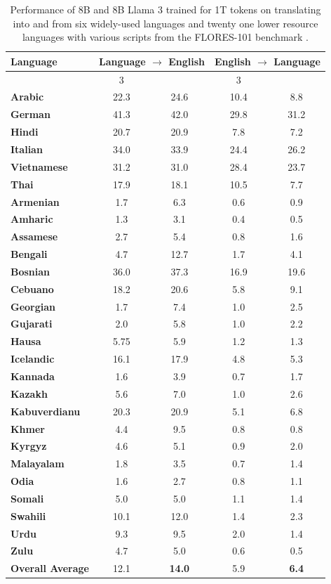 
\begin{table}[t]
\centering
\begin{tabular}{@{}lcccc@{}}
\toprule

 Language & \multicolumn{2}{c}{Language $\rightarrow$ English} & \multicolumn{2}{c}{English $\rightarrow$ Language} \\ 
\midrule
& \llama{} 3 & \model{} & \llama{} 3 & \model{} \\
 \midrule
 \textbf{Arabic} & 22.3 & 24.6 & 10.4  & 8.8 \\
 \textbf{German} & 41.3 & 42.0 & 29.8  & 31.2  \\
 \textbf{Hindi} & 20.7 & 20.9 & 7.8  & 7.2 \\ 
 \textbf{Italian} &  34.0  & 33.9 & 24.4 & 26.2 \\ 
 \textbf{Vietnamese} & 31.2  & 31.0 & 28.4 & 23.7 \\
 \textbf{Thai} &  17.9  & 18.1 & 10.5 & 7.7 \\
 
\midrule

\textbf{Armenian} & 1.7 & 6.3 & 0.6 & 0.9 \\
\textbf{Amharic} & 1.3  & 3.1 & 0.4 & 0.5 \\
\textbf{Assamese} & 2.7  & 5.4 & 0.8 & 1.6 \\
\textbf{Bengali} & 4.7 & 12.7 & 1.7 & 4.1 \\
\textbf{Bosnian} & 36.0 & 37.3 & 16.9 & 19.6 \\
\textbf{Cebuano} & 18.2 & 20.6 & 5.8 & 9.1 \\
\textbf{Georgian} & 1.7 & 7.4 & 1.0 & 2.5 \\
\textbf{Gujarati} & 2.0 & 5.8 & 1.0 & 2.2 \\
\textbf{Hausa} & 5.75 & 5.9 & 1.2 & 1.3 \\
\textbf{Icelandic} & 16.1 & 17.9 & 4.8 & 5.3 \\
\textbf{Kannada} & 1.6 & 3.9 & 0.7 &  1.7 \\
\textbf{Kazakh} & 5.6 & 7.0 & 1.0 & 2.6 \\
\textbf{Kabuverdianu} & 20.3 & 20.9 & 5.1 & 6.8 \\
\textbf{Khmer} & 4.4 & 9.5 & 0.8 & 0.8 \\
\textbf{Kyrgyz} & 4.6 & 5.1 & 0.9 & 2.0 \\
\textbf{Malayalam} & 1.8 & 3.5 & 0.7 & 1.4 \\
\textbf{Odia} & 1.6 & 2.7 & 0.8 & 1.1 \\
\textbf{Somali} & 5.0  & 5.0 & 1.1 & 1.4 \\
\textbf{Swahili} & 10.1 & 12.0 & 1.4 & 2.3 \\
\textbf{Urdu} & 9.3 & 9.5 & 2.0 & 1.4 \\
\textbf{Zulu} & 4.7 & 5.0 & 0.6 & 0.5 \\
\midrule
\textbf{Overall Average} & 12.1 & \textbf{14.0} & 5.9 & \textbf{6.4} \\
\bottomrule
\end{tabular}
\caption{Performance of 8B \model{} and 8B Llama 3 trained for 1T tokens on translating into and from six widely-used languages and twenty one lower resource languages with various scripts from the FLORES-101 benchmark \citep{goyal2022flores}. }
\label{tab:flores}
\end{table}
